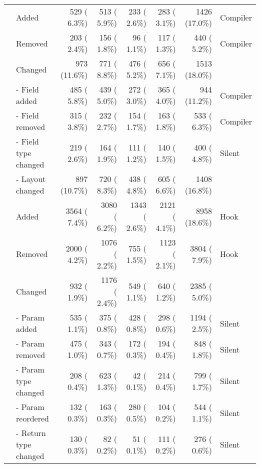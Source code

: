 \begin{table*}[t]
\begin{tabular}{c|l||r|r|r|r|r|l}
    \chead{7}{Struct}
     & Added                        & 529 ( 6.3\%)   & 513 ( 5.9\%)    & 233 ( 2.6\%)     & 283 ( 3.1\%)     & 1426 (17.0\%) & Compiler \\
     & Removed                      & 203 ( 2.4\%)   & 156 ( 1.8\%)    & 96 ( 1.1\%)      & 117 ( 1.3\%)     & 440 ( 5.2\%)  & Compiler \\
     & Changed                      & 973 (11.6\%)   & 771 ( 8.8\%)    & 476 ( 5.2\%)     & 656 ( 7.1\%)     & 1513 (18.0\%)            \\
     & - Field added                & 485 ( 5.8\%)   & 439 ( 5.0\%)    & 272 ( 3.0\%)     & 365 ( 4.0\%)     & 944 (11.2\%)  & Compiler \\
     & - Field removed              & 315 ( 3.8\%)   & 232 ( 2.7\%)    & 154 ( 1.7\%)     & 163 ( 1.8\%)     & 533 ( 6.3\%)  & Compiler \\
     & - Field type changed         & 219 ( 2.6\%)   & 164 ( 1.9\%)    & 111 ( 1.2\%)     & 140 ( 1.5\%)     & 400 ( 4.8\%)  & Silent   \\
     & - Layout changed             & 897 (10.7\%)   & 720 ( 8.3\%)    & 438 ( 4.8\%)     & 605 ( 6.6\%)     & 1408 (16.8\%)            \\
    \hline
    \chead{8}{Function}
     & Added                        & 3564 ( 7.4\%)  & 3080 ( 6.2\%)   & 1343 ( 2.6\%)    & 2121 ( 4.1\%)    & 8958 (18.6\%) & Hook     \\
     & Removed                      & 2000 ( 4.2\%)  & 1076 ( 2.2\%)   & 755 ( 1.5\%)     & 1123 ( 2.1\%)    & 3804 ( 7.9\%) & Hook     \\
     & Changed                      & 932 ( 1.9\%)   & 1176 ( 2.4\%)   & 549 ( 1.1\%)     & 640 ( 1.2\%)     & 2385 ( 5.0\%)            \\
     & - Param added                & 535 ( 1.1\%)   & 375 ( 0.8\%)    & 428 ( 0.8\%)     & 298 ( 0.6\%)     & 1194 ( 2.5\%) & Silent   \\
     & - Param removed              & 475 ( 1.0\%)   & 343 ( 0.7\%)    & 172 ( 0.3\%)     & 194 ( 0.4\%)     & 848 ( 1.8\%)  & Silent   \\
     & - Param type changed         & 208 ( 0.4\%)   & 623 ( 1.3\%)    & 42 ( 0.1\%)      & 214 ( 0.4\%)     & 799 ( 1.7\%)  & Silent   \\
     & - Param reordered            & 132 ( 0.3\%)   & 163 ( 0.3\%)    & 280 ( 0.5\%)     & 104 ( 0.2\%)     & 544 ( 1.1\%)  & Silent   \\
     & - Return type changed        & 130 ( 0.3\%)   & 82 ( 0.2\%)     & 51 ( 0.1\%)      & 111 ( 0.2\%)     & 276 ( 0.6\%)  & Silent   \\

\end{tabular}
\end{table*}
